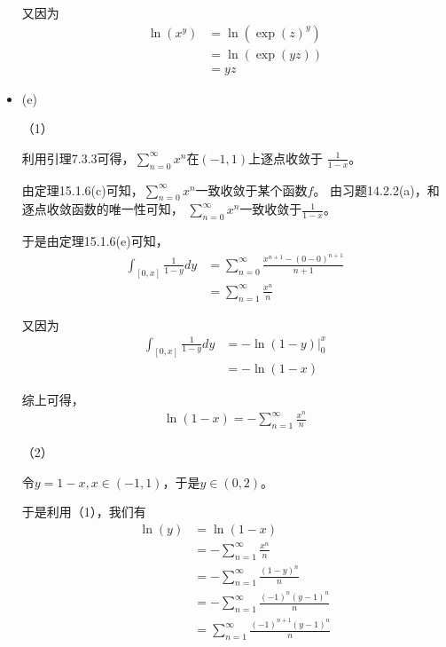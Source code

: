 \documentclass{article}
\begin{document}
\begin{itemize}
        又因为
        \begin{align*}
          \ln(x^y) & = \ln(\exp(z)^y) \\
                   & = \ln(\exp(yz))  \\
                   & = yz
        \end{align*}

  \item (e)

        （1）

        利用引理7.3.3可得，$\sum\limits_{n = 0}^\infty x^{n}$在$(-1, 1)$上逐点收敛于
        $\frac{1}{1 - x}$。

        由定理15.1.6(c)可知，$\sum\limits_{n = 0}^\infty x^{n}$一致收敛于某个函数$f$。
        由习题14.2.2(a)，和逐点收敛函数的唯一性可知，
        $\sum\limits_{n = 0}^\infty x^{n}$一致收敛于$\frac{1}{1 - x}$。

        于是由定理15.1.6(e)可知，
        \begin{align*}
          \int_{[0, x]} \frac{1}{1 - y} dy
           & = \sum\limits_{n = 0}^\infty \frac{x^{n + 1} - (0 - 0)^{n + 1}}{n + 1} \\
           & = \sum\limits_{n = 1}^\infty \frac{x^{n}}{n}
        \end{align*}

        又因为
        \begin{align*}
          \int_{[0, x]} \frac{1}{1 - y} dy
           & = -\ln(1 - y) |_0^x \\
           & = -\ln(1 - x)
        \end{align*}

        综上可得，
        \begin{align*}
          \ln(1 - x) = - \sum\limits_{n = 1}^\infty \frac{x^{n}}{n}
        \end{align*}

        （2）

        令$y = 1 - x, x \in (-1, 1)$，于是$y \in (0, 2)$。

        于是利用（1），我们有
        \begin{align*}
          \ln(y)
           & = \ln(1 - x)                                                   \\
           & = - \sum\limits_{n = 1}^\infty \frac{x^{n}}{n}                 \\
           & = - \sum\limits_{n = 1}^\infty \frac{(1 - y)^{n}}{n}           \\
           & = - \sum\limits_{n = 1}^\infty \frac{(-1)^n(y - 1)^{n}}{n}     \\
           & = \sum\limits_{n = 1}^\infty \frac{(-1)^{n + 1}(y - 1)^{n}}{n}
        \end{align*}
\end{itemize}
\end{document}
